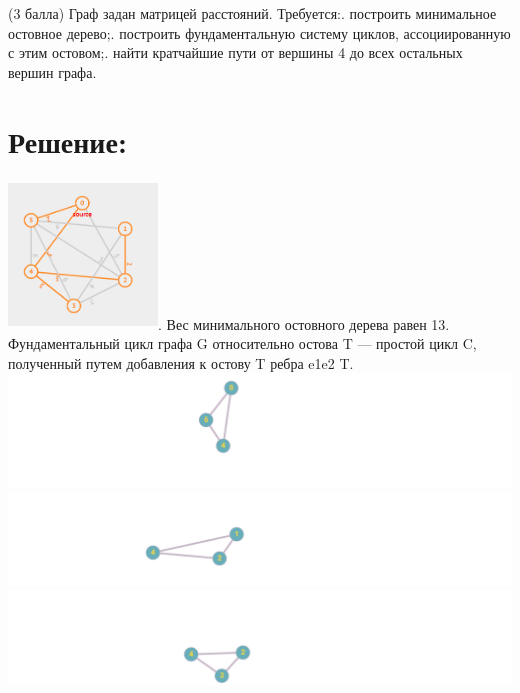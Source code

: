 \documentclass[a4paper,11pt]{article}
\theoremstyle{mytheor}
\begin{document}
{{(3 балла) Граф задан матрицей расстояний. Требуется:. построить минимальное остовное дерево;. построить фундаментальную систему циклов, ассоциированную с этим остовом;. найти кратчайшие пути от вершины 4 до всех остальных вершин графа.\newline

\section*{Решение:}
\includegraphics[width=150,height=150]{kruskal.PNG}. Вес минимального остовного дерева равен 13.\newline
{}\newline
Фундаментальный цикл графа G относительно остова T  — простой цикл C, полученный путем добавления к остову T ребра {e1e2} \not \in T. \\
\includegraphics[width=\textwidth,height=\textheight,keepaspectratio]{cycle.png}\newline
\includegraphics[width=\textwidth,height=\textheight,keepaspectratio]{cycle2.png}\newline
\includegraphics[width=\textwidth,height=\textheight,keepaspectratio]{cycle3.png}\newline 

}}
\end{document}

